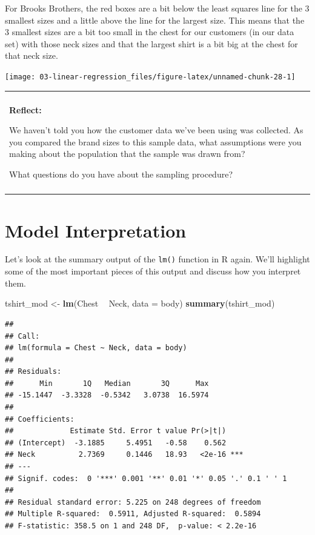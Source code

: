 \documentclass[
]{book}
\newenvironment{Shaded}{\begin{snugshade}}{\end{snugshade}}
\newcommand{\DataTypeTok}[1]{\textcolor[rgb]{0.13,0.29,0.53}{#1}}
\newcommand{\KeywordTok}[1]{\textcolor[rgb]{0.13,0.29,0.53}{\textbf{#1}}}
\newcommand{\NormalTok}[1]{#1}
\newcommand{\OperatorTok}[1]{\textcolor[rgb]{0.81,0.36,0.00}{\textbf{#1}}}
\newcommand{\StringTok}[1]{\textcolor[rgb]{0.31,0.60,0.02}{#1}}
\newenvironment{reflect}
{
    \begin{center}
    
    \begin{tabular}{|p{0.8\textwidth}|}
    \rowcolor{LightBlue}
    \hline\\
    \rowcolor{LightBlue}
    \textbf{Reflect:}
}
{
    \\\rowcolor{LightBlue}
    \\\hline
    \end{tabular} 
    \end{center}
}
\begin{document}
For Brooks Brothers, the red boxes are a bit below the least squares line for the 3 smallest sizes and a little above the line for the largest size. This means that the 3 smallest sizes are a bit too small in the chest for our customers (in our data set) with those neck sizes and that the largest shirt is a bit big at the chest for that neck size.

\begin{center}\texttt{[image: 03-linear-regression\_files/figure-latex/unnamed-chunk-28-1]} \end{center}

\begin{reflect}
We haven't told you how the customer data we've been using was
collected. As you compared the brand sizes to this sample data, what
assumptions were you making about the population that the sample was
drawn from?

What questions do you have about the sampling procedure?
\end{reflect}

\hypertarget{model-interpretation}{%
\section{Model Interpretation}\label{model-interpretation}}

Let's look at the summary output of the \texttt{lm()} function in R again. We'll highlight some of the most important pieces of this output and discuss how you interpret them.

\begin{Shaded}
\begin{Highlighting}[]
\NormalTok{tshirt_mod <-}\StringTok{ }\KeywordTok{lm}\NormalTok{(Chest }\OperatorTok{~}\StringTok{ }\NormalTok{Neck, }\DataTypeTok{data =}\NormalTok{ body)}
\KeywordTok{summary}\NormalTok{(tshirt_mod)}
\end{Highlighting}
\end{Shaded}

\begin{verbatim}
## 
## Call:
## lm(formula = Chest ~ Neck, data = body)
## 
## Residuals:
##      Min       1Q   Median       3Q      Max 
## -15.1447  -3.3328  -0.5342   3.0738  16.5974 
## 
## Coefficients:
##             Estimate Std. Error t value Pr(>|t|)    
## (Intercept)  -3.1885     5.4951   -0.58    0.562    
## Neck          2.7369     0.1446   18.93   <2e-16 ***
## ---
## Signif. codes:  0 '***' 0.001 '**' 0.01 '*' 0.05 '.' 0.1 ' ' 1
## 
## Residual standard error: 5.225 on 248 degrees of freedom
## Multiple R-squared:  0.5911,	Adjusted R-squared:  0.5894 
## F-statistic: 358.5 on 1 and 248 DF,  p-value: < 2.2e-16
\end{verbatim}
\end{document}
